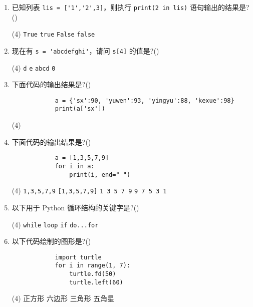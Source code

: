 \documentclass[11pt]{ctexart}
\begin{document}
\begin{enumerate}
        \newpage
        \item 已知列表 \lstinline{lis = ['1','2',3]}，则执行 \lstinline{print(2 in lis)} 语句输出的结果是?(\qquad)
        \begin{tasks}(4)
            \task \lstinline{True}
            \task \lstinline{true}
            \task \lstinline{False}
            \task \lstinline{false}
        \end{tasks}

        \item 现在有 \lstinline{s = 'abcdefghi'}，请问 \lstinline{s[4]} 的值是?(\qquad)
        \begin{tasks}(4)
            \task \lstinline{d}
            \task \lstinline{e}
            \task \lstinline{abcd}
            \task \lstinline{0}
        \end{tasks}

        \item 下面代码的输出结果是?(\qquad)
        \begin{lstlisting}
            a = {'sx':90, 'yuwen':93, 'yingyu':88, 'kexue':98}
            print(a['sx'])
        \end{lstlisting}
        \begin{tasks}(4)
        \end{tasks}

        \item 下面代码的输出结果是?(\qquad)
        \begin{lstlisting}
            a = [1,3,5,7,9]
            for i in a:
                print(i, end=" ")
        \end{lstlisting}
        \begin{tasks}(4)
            \task \lstinline{1,3,5,7,9}
            \task \lstinline{[1,3,5,7,9]}
            \task \lstinline{1 3 5 7 9}
            \task \lstinline{9 7 5 3 1}
        \end{tasks}

        \item 以下用于 Python 循环结构的关键字是?(\qquad)
        \begin{tasks}(4)
            \task \lstinline{while}
            \task \lstinline{loop}
            \task \lstinline{if}
            \task \lstinline{do...for}
        \end{tasks}
        
        \item 以下代码绘制的图形是?(\qquad)
        \begin{lstlisting}
            import turtle
            for i in range(1, 7):
                turtle.fd(50)
                turtle.left(60)
        \end{lstlisting}
        \begin{tasks}(4)
            \task 正方形
            \task 六边形
            \task 三角形
            \task 五角星
        \end{tasks}


\end{enumerate}
\end{document}
